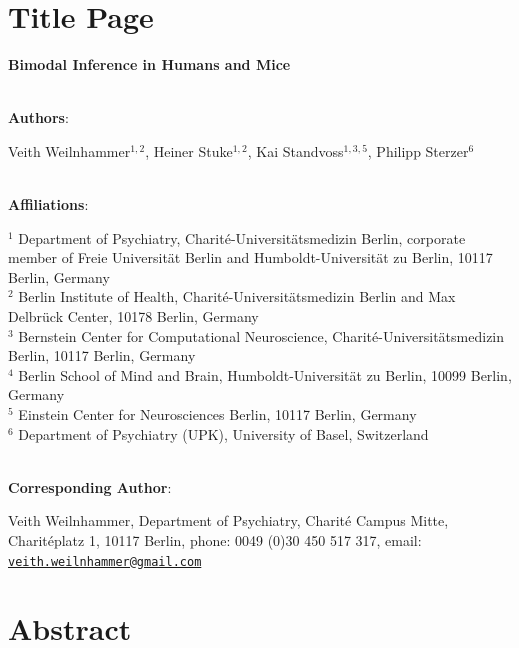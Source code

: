 \documentclass[
]{article}
\author{}
\date{\vspace{-2.5em}}
\begin{document}
\hypertarget{title-page}{%
\section{Title Page}\label{title-page}}

\textbf{Bimodal Inference in Humans and Mice}\\
\strut \\

\textbf{Authors}:

Veith Weilnhammer\(^{1,2}\), Heiner Stuke\(^{1,2}\), Kai
Standvoss\(^{1,3,5}\), Philipp Sterzer\(^{6}\)\\
\strut \\
\textbf{Affiliations}:

\(^{1}\) Department of Psychiatry, Charité-Universitätsmedizin Berlin,
corporate member of Freie Universität Berlin and Humboldt-Universität zu
Berlin, 10117 Berlin, Germany\\
\(^{2}\) Berlin Institute of Health, Charité-Universitätsmedizin Berlin
and Max Delbrück Center, 10178 Berlin, Germany\\
\(^{3}\) Bernstein Center for Computational Neuroscience,
Charité-Universitätsmedizin Berlin, 10117 Berlin, Germany\\
\(^{4}\) Berlin School of Mind and Brain, Humboldt-Universität zu
Berlin, 10099 Berlin, Germany\\
\(^{5}\) Einstein Center for Neurosciences Berlin, 10117 Berlin,
Germany\\
\(^{6}\) Department of Psychiatry (UPK), University of Basel,
Switzerland\\
\strut \\

\textbf{Corresponding Author}:

Veith Weilnhammer, Department of Psychiatry, Charité Campus Mitte,
Charitéplatz 1, 10117 Berlin, phone: 0049 (0)30 450 517 317, email:
\href{mailto:veith.weilnhammer@gmail.com}{\nolinkurl{veith.weilnhammer@gmail.com}}\\

\newpage

\linenumbers

\hypertarget{abstract}{%
\section{Abstract}\label{abstract}}
\end{document}
